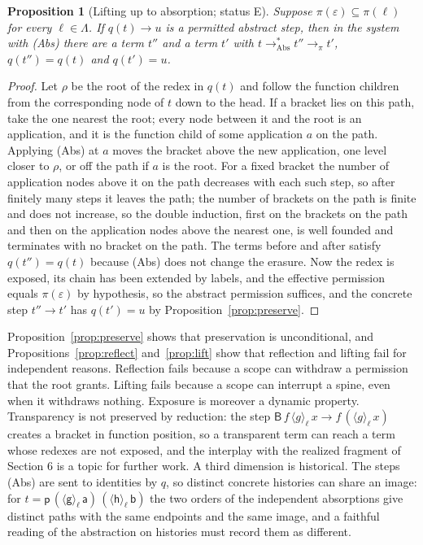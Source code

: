 \documentclass[11pt]{article}
\newtheorem{proposition}[theorem]{Proposition}
\theoremstyle{definition}
\theoremstyle{remark}
\newcommand{\cB}{\mathsf{B}}
\newcommand{\br}[2]{\langle #1\rangle_{#2}}
\newcommand{\Et}{status E}
\begin{document}
\begin{proposition}[Lifting up to absorption; \Et]\label{prop:absorb}
Suppose $\pi(\varepsilon)\subseteq\pi(\ell)$ for every $\ell\in\Lambda$. If $q(t)\to u$ is a permitted abstract step, then in the system with (Abs) there are a term $t''$ and a term $t'$ with $t\to_{\mathrm{Abs}}^{*}t''\to_\pi t'$, $q(t'')=q(t)$ and $q(t')=u$.
\end{proposition}

\begin{proof}
Let $\rho$ be the root of the redex in $q(t)$ and follow the function children from the corresponding node of $t$ down to the head. If a bracket lies on this path, take the one nearest the root; every node between it and the root is an application, and it is the function child of some application $a$ on the path. Applying (Abs) at $a$ moves the bracket above the new application, one level closer to $\rho$, or off the path if $a$ is the root. For a fixed bracket the number of application nodes above it on the path decreases with each such step, so after finitely many steps it leaves the path; the number of brackets on the path is finite and does not increase, so the double induction, first on the brackets on the path and then on the application nodes above the nearest one, is well founded and terminates with no bracket on the path. The terms before and after satisfy $q(t'')=q(t)$ because (Abs) does not change the erasure. Now the redex is exposed, its chain has been extended by labels, and the effective permission equals $\pi(\varepsilon)$ by hypothesis, so the abstract permission suffices, and the concrete step $t''\to t'$ has $q(t')=u$ by Proposition~\ref{prop:preserve}.
\end{proof}

Proposition~\ref{prop:preserve} shows that preservation is unconditional, and Propositions~\ref{prop:reflect} and~\ref{prop:lift} show that reflection and lifting fail for independent reasons. Reflection fails because a scope can withdraw a permission that the root grants. Lifting fails because a scope can interrupt a spine, even when it withdraws nothing. Exposure is moreover a dynamic property. Transparency is not preserved by reduction: the step $\cB\,f\,\br g\ell\,x\to f\,(\br g\ell\,x)$ creates a bracket in function position, so a transparent term can reach a term whose redexes are not exposed, and the interplay with the realized fragment of Section 6 is a topic for further work. A third dimension is historical. The steps (Abs) are sent to identities by $q$, so distinct concrete histories can share an image: for $t=\mathsf p\,(\br{\mathsf g}\ell\,\mathsf a)\,(\br{\mathsf h}\ell\,\mathsf b)$ the two orders of the independent absorptions give distinct paths with the same endpoints and the same image, and a faithful reading of the abstraction on histories must record them as different.
\end{document}
